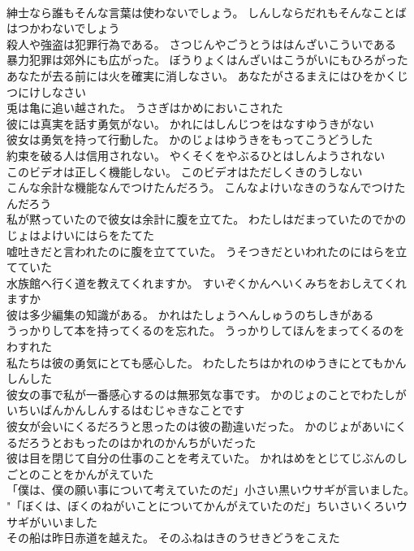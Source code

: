 \documentclass[8pt]{extreport}
\begin{document}
\begin{CJK}{UTF8}{min}
\\	紳士なら誰もそんな言葉は使わないでしょう。	しんしならだれもそんなことばはつかわないでしょう 
\\	殺人や強盗は犯罪行為である。	さつじんやごうとうははんざいこういである 
\\	暴力犯罪は郊外にも広がった。	ぼうりょくはんざいはこうがいにもひろがった 
\\	あなたが去る前には火を確実に消しなさい。	あなたがさるまえにはひをかくじつにけしなさい 
\\	兎は亀に追い越された。	うさぎはかめにおいこされた 
\\	彼には真実を話す勇気がない。	かれにはしんじつをはなすゆうきがない 
\\	彼女は勇気を持って行動した。	かのじょはゆうきをもってこうどうした 
\\	約束を破る人は信用されない。	やくそくをやぶるひとはしんようされない 
\\	このビデオは正しく機能しない。	このビデオはただしくきのうしない 
\\	こんな余計な機能なんでつけたんだろう。	こんなよけいなきのうなんでつけたんだろう 
\\	私が黙っていたので彼女は余計に腹を立てた。	わたしはだまっていたのでかのじょはよけいにはらをたてた 
\\	嘘吐きだと言われたのに腹を立てていた。	うそつきだといわれたのにはらを立てていた 
\\	水族館へ行く道を教えてくれますか。	すいぞくかんへいくみちをおしえてくれますか 
\\	彼は多少編集の知識がある。	かれはたしょうへんしゅうのちしきがある 
\\	うっかりして本を持ってくるのを忘れた。	うっかりしてほんをまってくるのをわすれた 
\\	私たちは彼の勇気にとても感心した。	わたしたちはかれのゆうきにとてもかんしんした 
\\	彼女の事で私が一番感心するのは無邪気な事です。	かのじょのことでわたしがいちいばんかんしんするはむじゃきなことです 
\\	彼女が会いにくるだろうと思ったのは彼の勘違いだった。	かのじょがあいにくるだろうとおもったのはかれのかんちがいだった 
\\	彼は目を閉じて自分の仕事のことを考えていた。	かれはめをとじてじぶんのしごとのことをかんがえていた 
\\	「僕は、僕の願い事について考えていたのだ」小さい黒いウサギが言いました。	"「ぼくは、ぼくのねがいことについてかんがえていたのだ」ちいさいくろいウサギがいいました 
\\	その船は昨日赤道を越えた。	そのふねはきのうせきどうをこえた 

\end{CJK}
\end{document}
